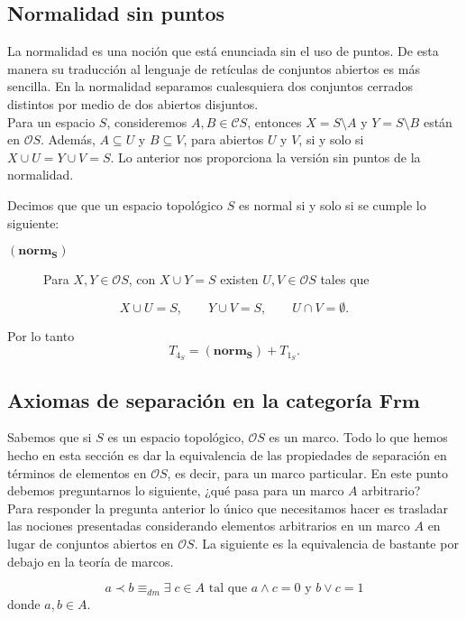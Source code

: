 \documentclass{comunicaciones}
\begin{document}
\subsection{Normalidad sin puntos}

La normalidad es una noción que está enunciada sin el uso de puntos. De esta manera su traducción al lenguaje de retículas de conjuntos abiertos es más sencilla. En la normalidad separamos cualesquiera dos conjuntos cerrados distintos por medio de dos abiertos disjuntos.\\

Para un espacio $S$, consideremos $A, B \in \mathcal{C}S$, entonces $X=S\setminus A$ y $Y=S\setminus B$ están en $\mathcal{O}S$. Además, $A\subseteq U$ y $B\subseteq V$, para abiertos $U$ y $V$, si y solo si $X\cup U= Y\cup V=S$. Lo anterior nos proporciona la versión sin puntos de la normalidad.
\begin{prop}
    Decimos que que un espacio topológico $S$ es normal si y solo si se cumple lo siguiente:
\begin{description}
\item[$(\mathbf{norm_S})$] Para $X, Y\in \mathcal{O}S$, con $X\cup Y=S$ existen $U, V\in \mathcal{O}S$ tales que
\end{description}
\[
X\cup U=S, \qquad Y\cup V=S,\qquad U\cap V=\emptyset.
\]
\end{prop}
Por lo tanto 
\[
T_{4_S}=(\mathbf{norm_S})+T_{1_S}.
\]

\subsection{Axiomas de separación en la categoría $\mathbf{Frm}$}
Sabemos que si $S$ es un espacio topológico, $\mathcal{O}S$ es un marco. Todo lo que hemos hecho en esta sección es dar la equivalencia de las propiedades de separación en términos de elementos en $\mathcal{O}S$, es decir, para un marco particular. En este punto debemos preguntarnos lo siguiente, ¿qué pasa para un marco $A$ arbitrario?\\

Para responder la pregunta anterior lo único que necesitamos hacer es trasladar las nociones presentadas considerando elementos arbitrarios en un marco $A$ en lugar de conjuntos abiertos en $\mathcal{O}S$. La siguiente es la equivalencia de bastante por debajo en la teoría de marcos.

\[
a\prec b \equiv_{dm} \exists \; c\in A \mbox{ tal que } a\wedge c=0 \mbox{ y } b\vee c=1
\]
donde $a, b\in A$.\\
\end{document}
